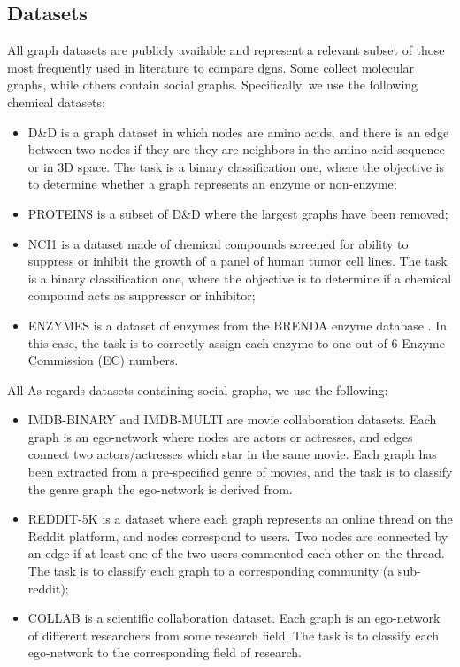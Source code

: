 \subsection{Datasets}
All  graph  datasets  are  publicly  available \cite{?}  and  represent  a  relevant subset of those most frequently used in literature to compare \glspl{dgn}. Some collect molecular graphs, while others contain social graphs. Specifically, we use the following chemical datasets:
\begin{itemize}
    \item D\&D \cite{?} is a graph dataset in which nodes are amino acids, and there is an edge between two nodes if they are they are neighbors in the amino-acid sequence or in 3D space. The task is a binary classification one, where the objective is to determine whether a graph represents an enzyme or non-enzyme;
    \item PROTEINS \cite{?} is a subset of D\&D where the largest graphs have been removed;
    \item NCI1 \cite{?} is a dataset made of chemical compounds screened for ability to suppress or inhibit the growth of a panel of human tumor cell lines. The task is a binary classification one, where the objective is to determine if a chemical compound acts as suppressor or inhibitor;
    \item ENZYMES \cite{?} is a dataset of enzymes from the BRENDA enzyme database \cite{?}. In this case, the task is to correctly assign each enzyme to one out of 6 Enzyme Commission (EC) numbers. 
\end{itemize}
All As regards datasets containing social graphs, we use the following:
\begin{itemize}
    \item IMDB-BINARY and IMDB-MULTI \cite{?} are movie collaboration datasets. Each graph is an ego-network where nodes are actors or actresses, and edges connect two actors/actresses which star in the same movie. Each graph has been extracted from a pre-specified genre of movies, and the task is to classify the genre graph the ego-network is derived from.
    \item REDDIT-5K \cite{?} is a dataset where each graph represents an online thread on the Reddit platform, and nodes correspond to users. Two nodes are connected by an edge if at least one of the two users commented each other on the thread. The task is to classify each graph to a corresponding community (a sub-reddit);
    \item COLLAB \cite{?} is a scientific collaboration dataset. Each graph is an ego-network of different researchers from some research field. The task is to classify each ego-network to the corresponding field of research.
\end{itemize}
